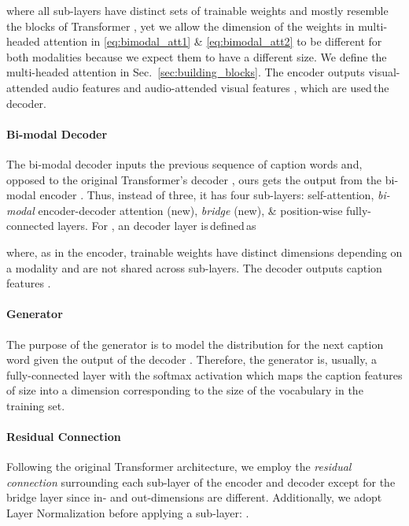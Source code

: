 \documentclass{src/bmvc2k}
\begin{document}
where all sub-layers have distinct sets of trainable weights and mostly resemble the blocks of Transformer \cite{transformer_Vaswani2017}, yet we allow the dimension of the weights in multi-headed attention in \eqref{eq:bimodal_att1} \& \eqref{eq:bimodal_att2} to be different for both modalities because we expect them to have a different size. We define the multi-headed attention in Sec.~\ref{sec:building_blocks}. The encoder outputs visual-attended audio features  and audio-attended visual features , which are used\,the\,decoder.

\vspace{-1.4ex}\paragraph{Bi-modal Decoder \label{sec:decoder}}
The bi-modal decoder inputs the previous sequence of caption words  and, opposed to the original Transformer's decoder \cite{transformer_Vaswani2017}, ours gets the output from the bi-modal encoder  . Thus, instead of three, it has four sub-layers: self-attention, \textit{bi-modal} encoder-decoder attention (new), \textit{bridge} (new), \& position-wise fully-connected layers. For , an  decoder layer is\,defined\,as

where, as in the encoder, trainable weights have distinct dimensions depending on a modality and are not shared across sub-layers. The decoder outputs caption features .

\vspace{-1.4ex}\paragraph{Generator} The purpose of the generator is to model the distribution for the next caption word  given the output of the decoder . Therefore, the generator is, usually, a fully-connected layer with the softmax activation which maps the caption features of size  into a dimension corresponding to the size of the vocabulary in the training set.

\paragraph{Residual Connection}
Following the original Transformer architecture, we employ the \textit{residual connection} \cite{ResNet_He2016} surrounding each sub-layer of the encoder and decoder except for the bridge layer since in- and out-dimensions are different. Additionally, we adopt Layer Normalization \cite{LayerNorm_Ba2016} before applying a sub-layer: .
\end{document}
